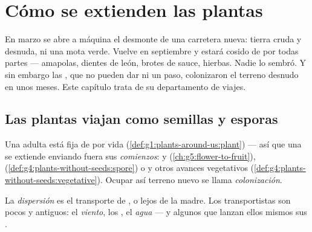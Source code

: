 \chapter{Cómo se extienden las plantas}\label{ch:g6:how-plants-spread}

En marzo se abre a máquina el desmonte de una carretera nueva: tierra
cruda y desnuda, ni una mota verde. Vuelve en septiembre y estará
cosido de  por todas partes --- amapolas, dientes de león,
brotes de sauce, hierbas. Nadie lo sembró. Y sin embargo las ,
que no pueden dar ni un paso, colonizaron el terreno desnudo en unos
meses. Este capítulo trata de su departamento de viajes.

\section{Las plantas viajan como semillas y esporas}

\begin{proposition}\label{prop:g6:how-plants-spread:travel}
Una  adulta está fija de por vida
(\cref{def:g1:plants-around-us:plant}) --- así que una  se
extiende enviando fuera sus \emph{comienzos}:  y 
(\cref{ch:g5:flower-to-fruit}), 
(\cref{def:g4:plants-without-seeds:spore}) o  y otros avances
vegetativos (\cref{def:g4:plants-without-seeds:vegetative}). Ocupar así
terreno nuevo se llama \emph{colonización}.
\end{proposition}
\admitted

\begin{definition}[Dispersión]\label{def:g6:how-plants-spread:dispersal}
La \emph{dispersión} es el transporte de ,
 o  lejos de la  madre. Los transportistas son pocos
y antiguos: el \emph{viento}, los \emph{}, el \emph{agua} ---
y algunos  que lanzan ellos mismos sus .
\end{definition}

